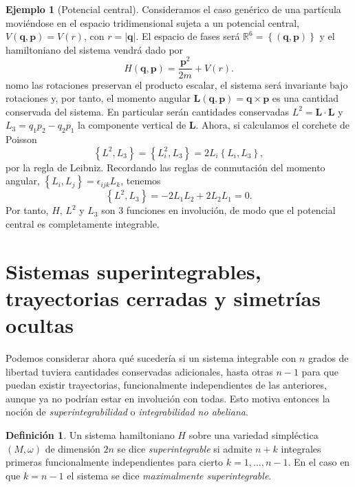 \documentclass[12pt,a4paper,twoside]{article}
\theoremstyle{definition} \newtheorem{defn}[thm]{Definición}
\theoremstyle{definition} \newtheorem{ejemplo}[thm]{Ejemplo}
\theoremstyle{definition} \newtheorem{ejercicio}[thm]{Ejercicio}
\theoremstyle{remark} \newtheorem*{obs}{Observación}
\def\RR{\mathbb{R}}
\newcommand{\vect}[1]{\mathbf{#1}}
\newcommand{\pois}[2]{\left\lbrace#1,#2\right\rbrace}
\begin{document}
  \begin{ejemplo}[Potencial central]
    Consideramos el caso genérico de una partícula moviéndose en el espacio tridimensional sujeta a un potencial central, $V(\vect{q},\vect{p})=V(r)$, con $r=|\vect{q}|$. El espacio de fases será $\RR^6=\left\{ (\vect{q},\vect{p}) \right\}$ y el hamiltoniano del sistema vendrá dado por
    \begin{equation}
      H(\vect{q},\vect{p})=\frac{\vect{p}^2}{2m}+V(r).
      \label{eq:central}
    \end{equation}
    nomo las rotaciones preservan el producto escalar, el sistema será invariante bajo rotaciones y, por tanto, el momento angular $\vect{L}(\vect{q},\vect{p})=\vect{q}\times \vect{p}$ es una cantidad conservada del sistema. En particular serán cantidades conservadas $L^2=\vect{L}\cdot \vect{L}$ y $L_3=q_1p_2-q_2p_1$ la componente vertical de $\vect{L}$. Ahora, si calculamos el corchete de Poisson
  \begin{equation*}
    \pois{L^2}{L_3}=\pois{L_i^2}{L_3}=2L_i\pois{L_i}{L_3},
  \end{equation*}
  por la regla de Leibniz. Recordando las reglas de conmutación del momento angular, $\left\{ L_i,L_j \right\}=\epsilon_{ijk}L_k$, tenemos
\begin{equation*}
  \pois{L^2}{L_3}=-2L_1L_2+2L_2L_1=0.
\end{equation*}
Por tanto, $H$, $L^2$ y $L_3$ son $3$ funciones en involución, de modo que el potencial central es completamente integrable.

  \end{ejemplo}
  \section{Sistemas superintegrables, trayectorias cerradas y simetrías ocultas}
  Podemos considerar ahora qué sucedería si un sistema integrable con $n$ grados de libertad tuviera cantidades conservadas adicionales, hasta otras $n-1$ para que puedan existir trayectorias, funcionalmente independientes de las anteriores, aunque ya no podrían estar en involución con todas. Esto motiva entonces la noción de \emph{superintegrabilidad} o \emph{integrabilidad no abeliana}.
  \begin{defn}
    Un sistema hamiltoniano $H$ sobre una variedad simpléctica $(M,\omega)$ de dimensión $2n$ se dice \emph{superintegrable} si admite $n+k$ integrales primeras funcionalmente independientes para cierto $k=1,\dots,n-1$. En el caso en que $k=n-1$ el sistema se dice \emph{maximalmente superintegrable}.
  \end{defn}
\end{document}
